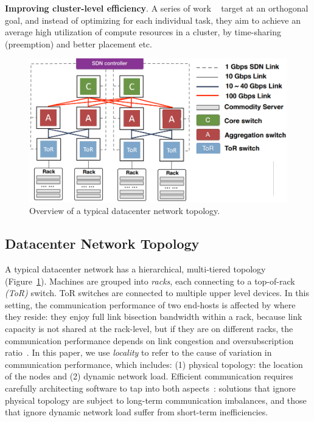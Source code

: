 \noindent\textbf{Improving cluster-level efficiency}. A series of work ~\cite{222611,Shen2018NexusA} target at an orthogonal goal, and instead of optimizing for each individual task, they aim to achieve an average high utilization of compute resources in a cluster, by time-sharing (preemption) and better placement etc.

\begin{figure}[t!]
	\centering
	\includegraphics[width=.6\linewidth, trim=2 3 3 3,clip]{Figures/dc.png}
	\caption{Overview of a typical datacenter network topology.}
	\label{fig:dc}
\end{figure}

\subsection{Datacenter Network Topology}
\label{sec:datacenternetwork}
A typical datacenter network has a hierarchical, multi-tiered topology~\cite{Mysore2009PortLandAS,VL2,Roy2015InsideTS,incbricks} (Figure~\ref{fig:dc}). Machines are grouped into \textit{racks}, each connecting to a top-of-rack \textit{(ToR)} switch. ToR switches are connected to multiple upper level devices. In this setting, the communication performance of two end-hosts is affected by where they reside: they enjoy full link bisection bandwidth within a rack, because link capacity is not shared at the rack-level, but if they are on different racks, the communication performance depends on link congestion and oversubscription ratio~\cite{Bilal2012ACS}. In this paper, we use \textit{locality} to refer to the cause of variation in communication performance, which includes: (1) physical topology: the location of the nodes and (2) dynamic network load. Efficient communication requires carefully architecting software to tap into both aspects~\cite{eyeQ, 27Octobe15:online}: solutions that ignore physical topology are subject to long-term communication imbalances, and those that ignore dynamic network load suffer from short-term inefficiencies.